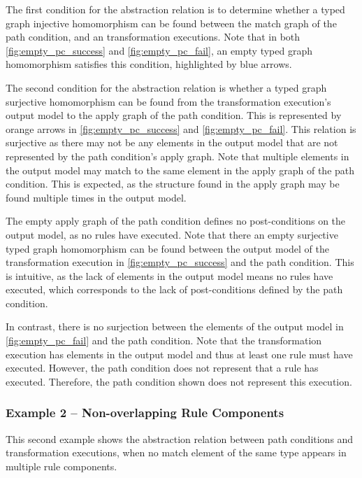 The first condition for the abstraction relation is to determine whether a typed graph injective homomorphism can be found between the match graph of the path condition, and an transformation executions. Note that in both \cref{fig:empty_pc_success} and \cref{fig:empty_pc_fail}, an empty typed graph homomorphism satisfies this condition, highlighted by blue arrows.


The second condition for the abstraction relation is whether a typed graph surjective homomorphism can be found from the transformation execution's output model to the apply graph of the path condition. This is represented by orange arrows in \cref{fig:empty_pc_success} and \cref{fig:empty_pc_fail}. This relation is surjective as there may not be any elements in the output model that are not represented by the path condition's apply graph. Note that multiple elements in the output model may match to the same element in the apply graph of the path condition. This is expected, as the structure found in the apply graph may be found multiple times in the output model.


The empty apply graph of the path condition defines no post-conditions on the output model, as no rules have executed. Note that there an empty surjective typed graph homomorphism can be found between the output model of the transformation execution in \cref{fig:empty_pc_success} and the path condition. This is intuitive, as the lack of elements in the output model means no rules have executed, which corresponds to the lack of post-conditions defined by the path condition.


In contrast, there is no surjection between the elements of the output model in \cref{fig:empty_pc_fail} and the path condition. Note that the transformation execution has elements in the output model and thus at least one rule must have executed. However, the path condition does not represent that a rule has executed. Therefore, the path condition shown does not represent this execution. 




\subsubsection{Example 2 -- Non-overlapping Rule Components}


This second example shows the abstraction relation between path conditions and transformation executions, when no match element of the same type appears in multiple rule components.

